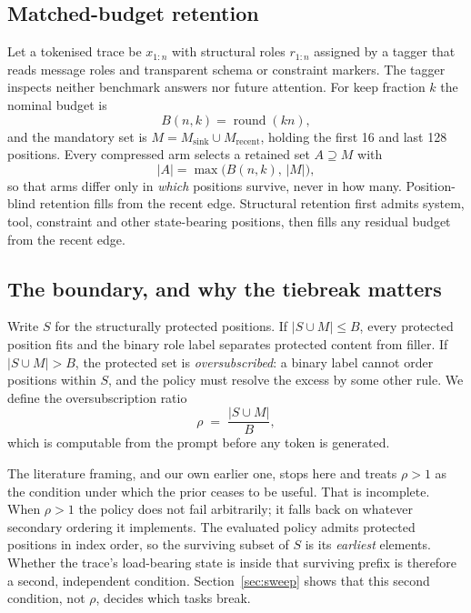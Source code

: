 \subsection{Matched-budget retention}
\label{sec:retention-method}

Let a tokenised trace be $x_{1:n}$ with structural roles $r_{1:n}$ assigned by a
tagger that reads message roles and transparent schema or constraint markers.
The tagger inspects neither benchmark answers nor future attention.  For keep
fraction $k$ the nominal budget is
\begin{equation}
  B(n,k)=\operatorname{round}(kn),
  \label{eq:budget}
\end{equation}
and the mandatory set is $M=M_{\mathrm{sink}}\cup M_{\mathrm{recent}}$, holding
the first 16 and last 128 positions.  Every compressed arm selects a retained
set $A\supseteq M$ with
\begin{equation}
  |A|=\max\bigl(B(n,k),\,|M|\bigr),
  \label{eq:matched}
\end{equation}
so that arms differ only in \emph{which} positions survive, never in how many.
Position-blind retention fills from the recent edge.  Structural retention first
admits system, tool, constraint and other state-bearing positions, then fills
any residual budget from the recent edge.

\subsection{The boundary, and why the tiebreak matters}
\label{sec:boundary-theory}

Write $S$ for the structurally protected positions.  If $|S\cup M|\le B$, every
protected position fits and the binary role label separates protected content
from filler.  If $|S\cup M|>B$, the protected set is \emph{oversubscribed}: a
binary label cannot order positions within $S$, and the policy must resolve the
excess by some other rule.  We define the oversubscription ratio
\begin{equation}
  \rho \;=\; \frac{|S\cup M|}{B},
  \label{eq:ratio}
\end{equation}
which is computable from the prompt before any token is generated.

The literature framing, and our own earlier one, stops here and treats $\rho>1$
as the condition under which the prior ceases to be useful.  That is incomplete.
When $\rho>1$ the policy does not fail arbitrarily; it falls back on whatever
secondary ordering it implements.  The evaluated policy admits protected
positions in index order, so the surviving subset of $S$ is its \emph{earliest}
elements.  Whether the trace's load-bearing state is inside that surviving
prefix is therefore a second, independent condition.  Section~\ref{sec:sweep}
shows that this second condition, not $\rho$, decides which tasks break.

